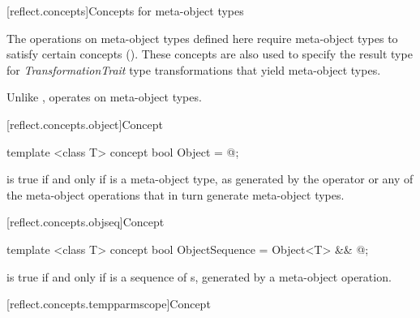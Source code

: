 [reflect.concepts]{Concepts for meta-object types}

\begin{std.txt}\color{addclr}
\pnum
The operations on meta-object types defined here require meta-object types to
satisfy certain concepts (). These concepts are also used to
specify the result type for \emph{TransformationTrait} type transformations that
yield meta-object types.
\begin{note} Unlike ,  operates on meta-object types.\end{note}

\end{std.txt}

[reflect.concepts.object]{Concept }

\begin{std.txt}\color{addclr}

\begin{itemdecl}
template <class T> concept bool Object = @\seebelow@;
\end{itemdecl}

\begin{itemdescr}
\pnum
{} is true if and only if  is a meta-object type, as generated by the  operator or any of the meta-object operations that in turn generate meta-object types.

\end{itemdescr}
\end{std.txt}

[reflect.concepts.objseq]{Concept }
\begin{std.txt}\color{addclr}

\begin{itemdecl}
template <class T> concept bool ObjectSequence = Object<T> && @\seebelow@;
\end{itemdecl}

\begin{itemdescr}
\pnum
{} is true if and only if  is a sequence of s, generated by a meta-object operation.

\end{itemdescr}
\end{std.txt}

[reflect.concepts.tempparmscope]{Concept }

